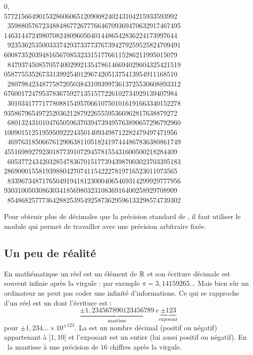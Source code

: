 \documentclass[class=report,crop=false]{standalone}
\begin{document}
\begin{center}
{\footnotesize
0, \hfill\hfill\  \\
  57721566490153286060651209008240243104215933593992 \ 35988057672348848677267776646709369470632917467495 \\
  14631447249807082480960504014486542836224173997644 \ 92353625350033374293733773767394279259525824709491 \\
  60087352039481656708532331517766115286211995015079 \ 84793745085705740029921354786146694029604325421519 \\
  05877553526733139925401296742051375413954911168510 \ 28079842348775872050384310939973613725530608893312 \\
  67600172479537836759271351577226102734929139407984 \ 30103417771778088154957066107501016191663340152278 \\
  93586796549725203621287922655595366962817638879272 \ 68013243101047650596370394739495763890657296792960 \\
  10090151251959509222435014093498712282479497471956 \ 46976318506676129063811051824197444867836380861749 \\
  45516989279230187739107294578155431600500218284409 \ 60537724342032854783670151773943987003023703395183 \\
  28690001558193988042707411542227819716523011073565 \ 83396734871765049194181230004065469314299929777956 \\
  93031005030863034185698032310836916400258929708909 \ 85486825777364288253954925873629596133298574739302\ \\
  }
\end{center}

Pour obtenir plus de décimales que la précision standard de \Python, il faut utiliser le module
 qui permet de travailler avec une précision arbitraire fixée.

\subsection{Un peu de réalité}

En mathématique un réel est un élément de $\mathbb{R}$ et son écriture décimale est souvent infinie après la virgule :
par exemple $\pi = 3,14159265\ldots$
Mais bien sûr un ordinateur ne peut pas coder une infinité d'informations. Ce qui se rapproche d'un réel est
un  dont l'écriture est :
$$\underbrace{\pm 1,234567890123456789}_{\text{mantisse}} \ e\underbrace{\pm 123}_{\text{exposant}}$$
pour $\pm 1,234\ldots \times 10^{\pm 123}$.
La  est un nombre décimal (positif ou négatif) appartenant à $[1,10[$ et l'exposant
est un entier (lui aussi positif ou négatif). En \Python\ la mantisse à une précision de
$16$ chiffres après la virgule.
\end{document}
